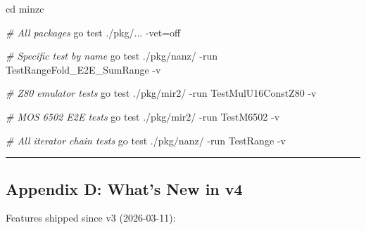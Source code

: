 \documentclass[
  11pt,
]{article}
\newenvironment{Shaded}{}{}
\newcommand{\AttributeTok}[1]{\textcolor[rgb]{0.49,0.56,0.16}{#1}}
\newcommand{\BuiltInTok}[1]{\textcolor[rgb]{0.00,0.50,0.00}{#1}}
\newcommand{\CommentTok}[1]{\textcolor[rgb]{0.38,0.63,0.69}{\textit{#1}}}
\newcommand{\ExtensionTok}[1]{#1}
\newcommand{\NormalTok}[1]{#1}
\newcommand{\OperatorTok}[1]{\textcolor[rgb]{0.40,0.40,0.40}{#1}}
\begin{document}
\begin{Shaded}
\begin{Highlighting}[]
\BuiltInTok{cd}\NormalTok{ minzc}

\CommentTok{\# All packages}
\ExtensionTok{go}\NormalTok{ test ./pkg/... }\AttributeTok{{-}vet}\OperatorTok{=}\NormalTok{off}

\CommentTok{\# Specific test by name}
\ExtensionTok{go}\NormalTok{ test ./pkg/nanz/ }\AttributeTok{{-}run}\NormalTok{ TestRangeFold\_E2E\_SumRange }\AttributeTok{{-}v}

\CommentTok{\# Z80 emulator tests}
\ExtensionTok{go}\NormalTok{ test ./pkg/mir2/ }\AttributeTok{{-}run}\NormalTok{ TestMulU16ConstZ80 }\AttributeTok{{-}v}

\CommentTok{\# MOS 6502 E2E tests}
\ExtensionTok{go}\NormalTok{ test ./pkg/mir2/ }\AttributeTok{{-}run}\NormalTok{ TestM6502 }\AttributeTok{{-}v}

\CommentTok{\# All iterator chain tests}
\ExtensionTok{go}\NormalTok{ test ./pkg/nanz/ }\AttributeTok{{-}run}\NormalTok{ TestRange }\AttributeTok{{-}v}
\end{Highlighting}
\end{Shaded}

\begin{center}\rule{0.5\linewidth}{0.5pt}\end{center}

\subsection{Appendix D: What's New in
v4}\label{appendix-d-whats-new-in-v4}

Features shipped since v3 (2026-03-11):
\end{document}
